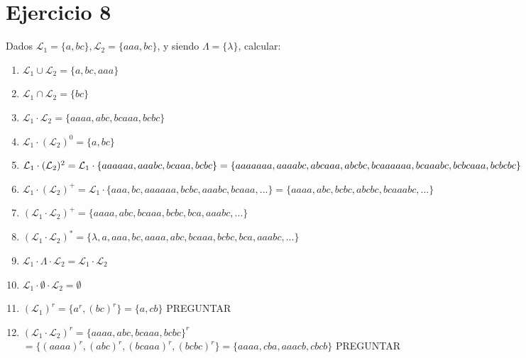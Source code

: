 \documentclass[12pt]{article}
\begin{document}
\section*{Ejercicio 8}
Dados $\mathcal{L}_1= \{a,bc\}, \mathcal{L}_2 = \{aaa,bc\}$, y siendo $\Lambda = \{\lambda\}$, calcular:
\begin{enumerate}[label=\Roman*.]
    \item $\mathcal{L}_1 \cup \mathcal{L}_2 = \{a,bc,aaa\}$
    \item $\mathcal{L}_1 \cap \mathcal{L}_2 = \{bc\}$
    \item $\mathcal{L}_1 \cdot \mathcal{L}_2 = \{aaaa,abc,bcaaa,bcbc\}$
    \item $\mathcal{L}_1 \cdot (\mathcal{L}_2)^0 = \{a,bc\}$
    \item $\mathcal{L}_1 \cdot (\mathcal{L}_2)^2 = \mathcal{L}_1 \cdot\{aaaaaa,aaabc,bcaaa,bcbc\} \\
    = \{aaaaaaa,aaaabc,abcaaa,abcbc,bcaaaaaa,bcaaabc,bcbcaaa,bcbcbc\}$
    \item $\mathcal{L}_1 \cdot (\mathcal{L}_2)^+ = \mathcal{L}_1 \cdot\{aaa,bc,aaaaaa,bcbc,aaabc,bcaaa,...\} = \{aaaa,abc,bcbc,abcbc,bcaaabc,...\}$
    \item $(\mathcal{L}_1 \cdot \mathcal{L}_2)^+ = \{aaaa,abc,bcaaa,bcbc,bca,aaabc,...\}$
    \item $(\mathcal{L}_1 \cdot \mathcal{L}_2)^* = \{\lambda,a,aaa,bc,aaaa,abc,bcaaa,bcbc,bca,aaabc,...\}$
    \item $\mathcal{L}_1 \cdot \Lambda \cdot \mathcal{L}_2 = \mathcal{L}_1 \cdot \mathcal{L}_2$
    \item $\mathcal{L}_1 \cdot \emptyset \cdot \mathcal{L}_2 = \emptyset$
    \item $(\mathcal{L}_1)^r = \{a^r,(bc)^r\} =\{a,cb\}$ PREGUNTAR
    \item $(\mathcal{L}_1 \cdot \mathcal{L}_2)^r = \{aaaa,abc,bcaaa,bcbc\}^r$ \\
    $ = \{(aaaa)^r,(abc)^r,(bcaaa)^r,(bcbc)^r\} = \{aaaa,cba,aaacb,cbcb\}$ PREGUNTAR
\end{enumerate}
\end{document}
